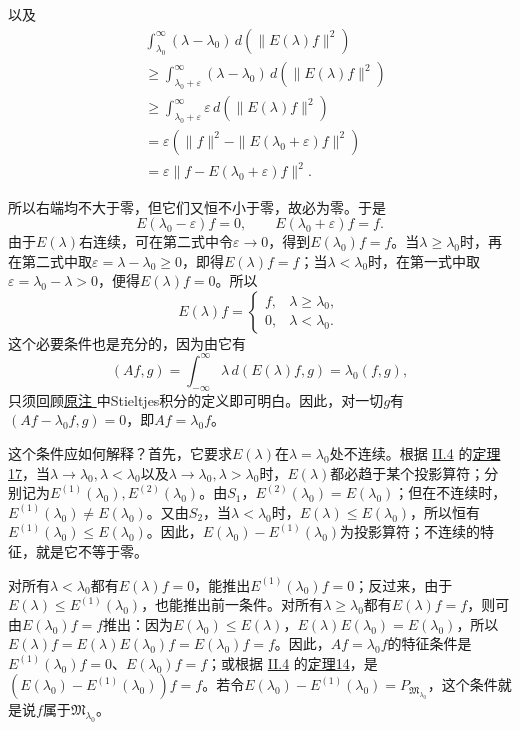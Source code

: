 \documentclass[fontsize=13pt,twoside,openany,headings=normal,parskip=false,bookmarkpackage=false,DIV=calc]{scrbook}
\begin{document}
以及
\begin{align*}
&\int_{\lambda_0}^{\infty}(\lambda-\lambda_0)\,d(\|E(\lambda)f\|^2)\\
&\geq\int_{\lambda_0+\varepsilon}^{\infty}(\lambda-\lambda_0)\,d(\|E(\lambda)f\|^2)\\
&\geq\int_{\lambda_0+\varepsilon}^{\infty}\varepsilon\,d(\|E(\lambda)f\|^2)\\
&=\varepsilon(\|f\|^2-\|E(\lambda_0+\varepsilon)f\|^2)\\
&=\varepsilon\|f-E(\lambda_0+\varepsilon)f\|^2.
\end{align*}

\hypertarget{origpage-64}{}\label{origpage-64}所以右端均不大于零，但它们又恒不小于零，故必为零。于是
\[
E(\lambda_0-\varepsilon)f=0,\qquad E(\lambda_0+\varepsilon)f=f.
\]
由于$E(\lambda)$右连续，可在第二式中令$\varepsilon\to0$，得到$E(\lambda_0)f=f$。当$\lambda\geq\lambda_0$时，再在第二式中取$\varepsilon=\lambda-\lambda_0\geq0$，即得$E(\lambda)f=f$；当$\lambda<\lambda_0$时，在第一式中取$\varepsilon=\lambda_0-\lambda>0$，便得$E(\lambda)f=0$。所以
\[
E(\lambda)f=\begin{cases}f,&\lambda\geq\lambda_0,\\0,&\lambda<\lambda_0.\end{cases}
\]
这个必要条件也是充分的，因为由它有
\[
(Af,g)=\int_{-\infty}^{\infty}\lambda\,d(E(\lambda)f,g)=\lambda_0(f,g),
\]
只须回顾\CJKglue \hyperlink{note-73}{原注 } 中Stieltjes积分的定义即可明白。因此，对一切$g$有$(Af-\lambda_0f,\allowbreak g)=0$，即$Af=\lambda_0f$。

这个条件应如何解释？首先，它要求$E(\lambda)$在$\lambda=\lambda_0$处不连续。根据 \hyperref[sec:II.4]{II.4} 的\CJKglue \hyperref[thm:II.17]{定理17}，当$\lambda\to\lambda_0,\allowbreak \lambda<\lambda_0$以及$\lambda\to\lambda_0,\allowbreak \lambda>\lambda_0$时，$E(\lambda)$都必趋于某个投影算符；分别记为$E^{(1)}(\lambda_0),\allowbreak E^{(2)}(\lambda_0)$。由$\hyperref[cond:II.S1]{S_1}$，$E^{(2)}(\lambda_0)=E(\lambda_0)$；但在不连续时，$E^{(1)}(\lambda_0)\ne E(\lambda_0)$。又由$\hyperref[cond:II.S2]{S_2}$，当$\lambda<\lambda_0$时，$E(\lambda)\leq E(\lambda_0)$，所以恒有$E^{(1)}(\lambda_0)\leq E(\lambda_0)$。因此，$E(\lambda_0)-E^{(1)}(\lambda_0)$为投影算符；不连续的特征，就是它不等于零。

对所有$\lambda<\lambda_0$都有$E(\lambda)f=0$，能推出$E^{(1)}(\lambda_0)f=0$；反过来，由于$E(\lambda)\leq E^{(1)}(\lambda_0)$，也能推出前一条件。对所有$\lambda\geq\lambda_0$都有$E(\lambda)f=f$，则可由$E(\lambda_0)f=f$推出：因为$E(\lambda_0)\leq E(\lambda)$，$E(\lambda)E(\lambda_0)=E(\lambda_0)$，所以$E(\lambda)f=E(\lambda)E(\lambda_0)f=E(\lambda_0)f=f$。因此，$Af=\lambda_0f$的特征条件是$E^{(1)}(\lambda_0)f=0$、$E(\lambda_0)f=f$；或根据 \hyperref[sec:II.4]{II.4} 的\CJKglue \hyperref[thm:II.14]{定理14}，是$(E(\lambda_0)-E^{(1)}(\lambda_0))f=f$。若令$E(\lambda_0)-E^{(1)}(\lambda_0)=P_{\mathfrak{M}_{\lambda_0}}$，这个条件就是说$f$属于$\mathfrak{M}_{\lambda_0}$。
\end{document}
